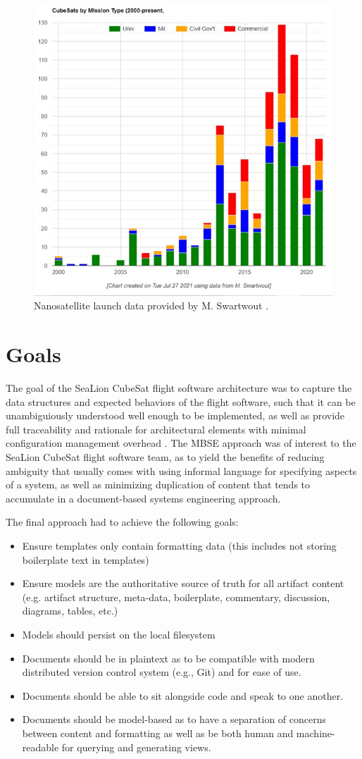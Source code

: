 \documentclass[conf]{new-aiaa}
\begin{document}
\begin{figure}[hbt!]
    \centering
    \includegraphics[width=.5\textwidth]{swartwout_data_graph}
    \caption{Nanosatellite launch data provided by M. Swartwout \cite{swartwout_data}.}
    \label{swartwout_data_graph}
\end{figure}


\section{Goals}

The goal of the SeaLion CubeSat flight software architecture was to capture the data structures and expected behaviors of the flight software, such that it can be unambiguiously understood well enough to be implemented, as well as provide full traceability and rationale for architectural elements with minimal configuration management overhead \cite{sealion_mission_architecture}. The MBSE approach was of interest to the SeaLion CubeSat flight software team, as to yield the benefits of reducing ambiguity that usually comes with using informal language for specifying aspects of a system, as well as minimizing duplication of content that tends to accumulate in a document-based systems engineering approach.

The final approach had to achieve the following goals:
\begin{itemize}
    \item Ensure templates only contain formatting data (this includes not storing boilerplate text in templates)
    
    \item Ensure models are the authoritative source of truth for all artifact content (e.g. artifact structure, meta-data, boilerplate, commentary, discussion, diagrams, tables, etc.)
    
    \item Models should persist on the local filesystem
    
    \item Documents should be in plaintext as to be compatible with modern distributed version control system (e.g., Git) and for ease of use.
    
    \item Documents should be able to sit alongside code and speak to one another.
    
    \item Documents should be model-based as to have a separation of concerns between content and formatting as well as be both human and machine-readable for querying and generating views.
\end{itemize}
\end{document}
